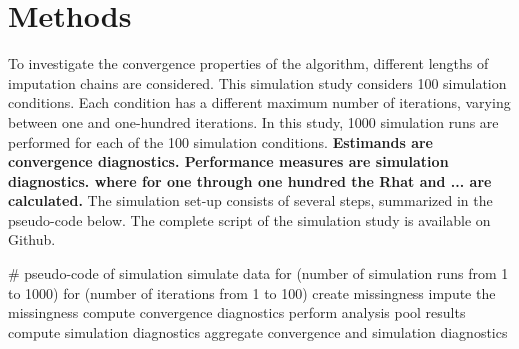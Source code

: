 \documentclass[article]{jss}
\begin{document}
% 
% 



\section{Methods} \label{sec:methods}

To investigate the convergence properties of the  algorithm, different lengths of imputation chains are considered. This simulation study considers 100 simulation conditions. Each condition has a different maximum number of iterations, varying between one and one-hundred iterations. In this study, 1000 simulation runs are performed for each of the 100 simulation conditions. \textbf{Estimands are convergence diagnostics. Performance measures are simulation diagnostics.  where for one through one hundred the Rhat and ... are calculated.} The simulation set-up consists of several steps, summarized in the pseudo-code below. The complete  script of the simulation study is available on Github.

\begin{Code}
# pseudo-code of simulation 
simulate data 
for (number of simulation runs from 1 to 1000)
  for (number of iterations from 1 to 100)
    create missingness
    impute the missingness
    compute convergence diagnostics
    perform analysis
    pool results
    compute simulation diagnostics
aggregate convergence and simulation diagnostics
\end{Code}
\end{document}
